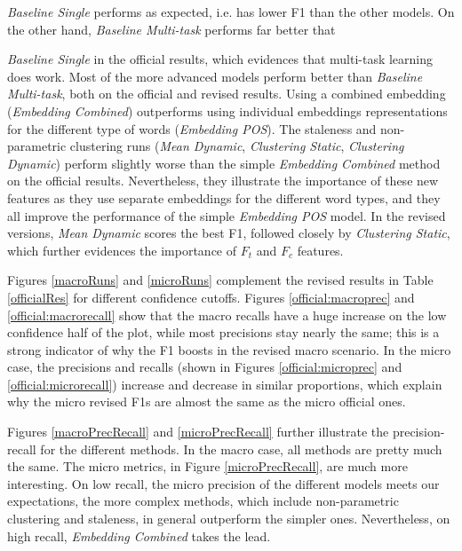 \documentclass{article}
\begin{document}
{\textit{Baseline Single} performs as expected, i.e. has lower F1 than the other models.
On the other hand, {\textit{Baseline Multi-task}} performs far better that {\textit{Baseline Single} in the official results, which evidences that multi-task learning does work.
Most of the more advanced models perform better than {\textit{Baseline Multi-task}}, both on the official and revised results. Using a combined embedding ({\textit{Embedding Combined}}) outperforms using individual embeddings representations for the different type of words ({\textit{Embedding POS}}).
The staleness and non-parametric clustering runs ({\textit{Mean Dynamic}}, {\textit{Clustering Static}}, {\textit{Clustering Dynamic}}) perform slightly worse than the simple {\textit{Embedding Combined}} method on the official results. Nevertheless, they illustrate the importance of these new features as they use separate embeddings for the different word types, and they all improve the performance of the simple {\textit{Embedding POS}} model. In the revised versions, {\textit{Mean Dynamic}} scores the best F1, followed closely by {\textit{Clustering Static}}, which further evidences the importance of $F_t$ and $F_c$ features.

Figures \ref{macroRuns} and \ref{microRuns} complement the revised results in Table \ref{officialRes} for different confidence cutoffs. Figures \ref{official:macroprec} and \ref{official:macrorecall} show that the macro recalls have a huge increase on the low confidence half of the plot, while most precisions stay nearly the same; this is a strong indicator of why the F1 boosts in the revised macro scenario.
In the micro case, the precisions and recalls (shown in Figures \ref{official:microprec} and \ref{official:microrecall}) increase and decrease in similar proportions, which explain why the micro revised F1s are almost the same as the micro official ones. 

Figures \ref{macroPrecRecall} and \ref{microPrecRecall} further illustrate the precision-recall for the different methods. In the macro case, all methods are pretty much the same. The micro metrics, in Figure \ref{microPrecRecall}, are much more interesting. On low recall, the micro precision of the different models meets our expectations, the more complex methods, which include non-parametric clustering and staleness, in general outperform the simpler ones. Nevertheless, on high recall, {\textit{Embedding Combined}} takes the lead.


}}
\end{document}

